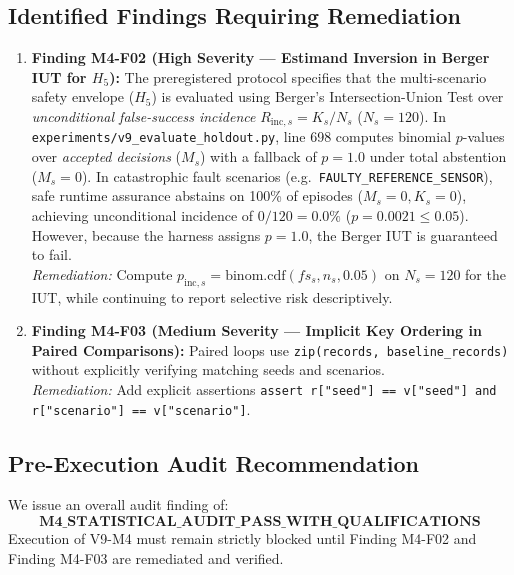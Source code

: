 \documentclass[10pt,a4paper]{article}
\begin{document}
\subsection{Identified Findings Requiring Remediation}
\begin{enumerate}
    \item \textbf{Finding M4-F02 (High Severity --- Estimand Inversion in Berger IUT for $H_5$):} The preregistered protocol specifies that the multi-scenario safety envelope ($H_5$) is evaluated using Berger's Intersection-Union Test over \textit{unconditional false-success incidence} $R_{\mathrm{inc}, s} = K_s / N_s$ ($N_s = 120$). In \texttt{experiments/v9\_evaluate\_holdout.py}, line 698 computes binomial $p$-values over \textit{accepted decisions} ($M_s$) with a fallback of $p=1.0$ under total abstention ($M_s = 0$). In catastrophic fault scenarios (e.g.\ \texttt{FAULTY\_REFERENCE\_SENSOR}), safe runtime assurance abstains on 100\% of episodes ($M_s=0, K_s=0$), achieving unconditional incidence of $0/120 = 0.0\%$ ($p = 0.0021 \le 0.05$). However, because the harness assigns $p = 1.0$, the Berger IUT is guaranteed to fail.\\
    \textit{Remediation:} Compute $p_{\mathrm{inc}, s} = \mathrm{binom.cdf}(fs_s, n_s, 0.05)$ on $N_s = 120$ for the IUT, while continuing to report selective risk descriptively.
    \item \textbf{Finding M4-F03 (Medium Severity --- Implicit Key Ordering in Paired Comparisons):} Paired loops use \texttt{zip(records, baseline\_records)} without explicitly verifying matching seeds and scenarios.\\
    \textit{Remediation:} Add explicit assertions \texttt{assert r["seed"] == v["seed"] and r["scenario"] == v["scenario"]}.
\end{enumerate}

\subsection{Pre-Execution Audit Recommendation}
We issue an overall audit finding of:
\begin{equation}
\mathbf{M4\_STATISTICAL\_AUDIT\_PASS\_WITH\_QUALIFICATIONS}
\end{equation}
Execution of V9-M4 must remain strictly blocked until Finding M4-F02 and Finding M4-F03 are remediated and verified.

\vspace{10pt}
\end{document}
